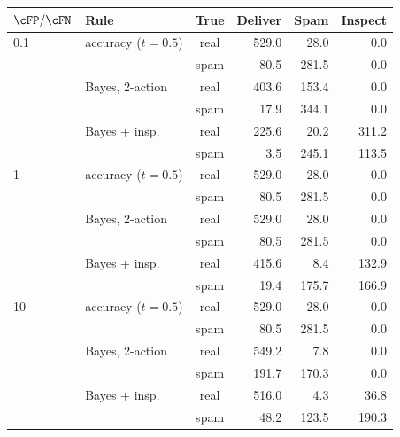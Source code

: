 \begin{tabular}{llcrrr}
\toprule
$\cFP/\cFN$ & Rule & True & Deliver & Spam & Inspect \\
\midrule
0.1 & accuracy ($t=0.5$) & real & 529.0 & 28.0 & 0.0 \\
 &  & spam & 80.5 & 281.5 & 0.0 \\
 & Bayes, 2-action & real & 403.6 & 153.4 & 0.0 \\
 &  & spam & 17.9 & 344.1 & 0.0 \\
 & Bayes + insp. & real & 225.6 & 20.2 & 311.2 \\
 &  & spam & 3.5 & 245.1 & 113.5 \\
\midrule
1 & accuracy ($t=0.5$) & real & 529.0 & 28.0 & 0.0 \\
 &  & spam & 80.5 & 281.5 & 0.0 \\
 & Bayes, 2-action & real & 529.0 & 28.0 & 0.0 \\
 &  & spam & 80.5 & 281.5 & 0.0 \\
 & Bayes + insp. & real & 415.6 & 8.4 & 132.9 \\
 &  & spam & 19.4 & 175.7 & 166.9 \\
\midrule
10 & accuracy ($t=0.5$) & real & 529.0 & 28.0 & 0.0 \\
 &  & spam & 80.5 & 281.5 & 0.0 \\
 & Bayes, 2-action & real & 549.2 & 7.8 & 0.0 \\
 &  & spam & 191.7 & 170.3 & 0.0 \\
 & Bayes + insp. & real & 516.0 & 4.3 & 36.8 \\
 &  & spam & 48.2 & 123.5 & 190.3 \\
\bottomrule
\end{tabular}
